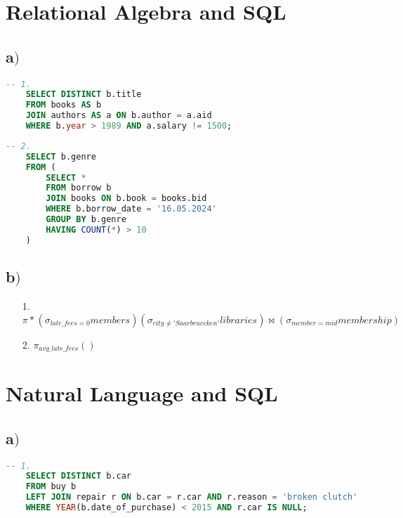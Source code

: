 



\section{ Relational Algebra and SQL}	

\subsection{a$)$}

\begin{lstlisting}[language=SQL]
	-- 1.
	SELECT DISTINCT b.title
	FROM books AS b
	JOIN authors AS a ON b.author = a.aid
	WHERE b.year > 1989 AND a.salary != 1500;
\end{lstlisting}

\begin{lstlisting}[language=SQL]
	-- 2.
	SELECT b.genre
	FROM (
		SELECT *
		FROM borrow b
		JOIN books ON b.book = books.bid
		WHERE b.borrow_date = '16.05.2024'
		GROUP BY b.genre
		HAVING COUNT(*) > 10
	)
\end{lstlisting}

\subsection{b$)$}

\begin{itemize}
	\item[1.] $\pi * ({\sigma}_{late\_fees = 0} members) ({\sigma}_{city \neq 'Saarbruecken'} libraries) \Join ({\sigma}_{member = mid} membership)$
	\item[2.] ${\pi}_{avg\_late\_fees} ()$
\end{itemize}
	
\section{Natural Language and SQL}	

\subsection{a$)$}

\begin{lstlisting}[language=SQL]
	-- 1.
	SELECT DISTINCT b.car
	FROM buy b
	LEFT JOIN repair r ON b.car = r.car AND r.reason = 'broken clutch'
	WHERE YEAR(b.date_of_purchase) < 2015 AND r.car IS NULL;
\end{lstlisting}

